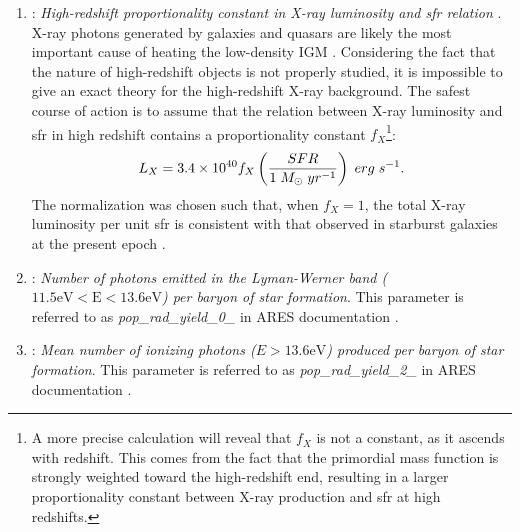 \documentclass[12pt, TexShade, letterpaper]{report}
\begin{document}
\begin{enumerate}
    \item {}: \emph{High-redshift proportionality constant in X-ray luminosity and \gls{sfr} relation} \cite{ares_documentation}. 
    X-ray photons generated by galaxies and quasars are likely the most important cause of heating the low-density IGM \cite{low_frequency}. Considering the fact that the nature of high-redshift objects is not properly studied, it is impossible to give an exact theory for the high-redshift X-ray background. The safest course of action is to assume that the relation between X-ray luminosity and \gls{sfr} in high redshift contains a proportionality constant $f_X$\footnote{A more precise calculation will reveal that $f_X$ is not a constant, as it ascends with redshift. This comes from the fact that the primordial mass function is strongly weighted toward the high-redshift end, resulting in a larger proportionality constant between X-ray production and \gls{sfr} at high redshifts.}:
    \begin{equation}
        L_X = 3.4 \times 10^{40} f_X \left( \frac{SFR}{1 \hspace{0.1cm} M_{\odot} \hspace{0.1cm} yr^{-1}}\right) \hspace{0.1cm} erg \hspace{0.1cm}s^{-1}.
    \end{equation}
    The normalization was chosen such that, when $f_X =1$, the total X-ray luminosity per unit \gls{sfr} is consistent with that observed in starburst galaxies at the present epoch \cite{low_frequency, 21century}.
    
    \item {}: \emph{Number of photons emitted in the Lyman-Werner band ($\mathrm{11.5eV<E<13.6eV}$) per baryon of star formation}. This parameter is referred to as \emph{pop\_rad\_yield\_0\_} in ARES documentation \cite{ares_documentation, lw_background}.
    
    \item {}: \emph{Mean number of ionizing photons ($E>\mathrm{13.6eV}$) produced per baryon of star formation}. This parameter is referred to as \emph{pop\_rad\_yield\_2\_} in ARES documentation \cite{ares_documentation, 21century}.
    

\end{enumerate}
\end{document}

